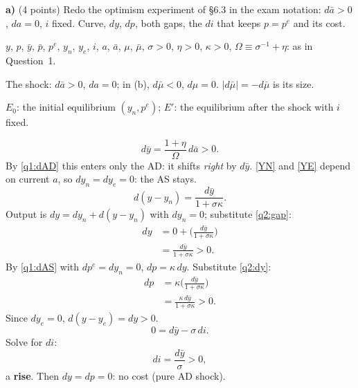 \textbf{a)} (4 points) Redo the optimism experiment of \S6.3 in the exam notation: $d\bar a>0$, $da=0$, $i$ fixed. Curve, $dy$, $dp$, both
gaps, the $di$ that keeps $p=p^e$ and its cost.
\resolespaco
\begin{sol}
\begin{notacao}
\item $y$, $p$, $\bar y$, $\bar p$, $p^e$, $y_n$, $y_e$, $i$, $a$, $\bar a$, $\mu$, $\bar\mu$, $\sigma>0$, $\eta>0$, $\kappa>0$, $\Omega\equiv\sigma^{-1}+\eta$: as in Question~1.
\item The shock: $d\bar a>0$, $da=0$; in (b), $d\bar\mu<0$, $d\mu=0$. $|d\bar\mu|=-d\bar\mu$ is its size.
\item $E_0$: the initial equilibrium $(y_n,p^e)$; $E'$: the equilibrium after the shock with $i$ fixed.
\end{notacao}
\begin{equation}
d\bar y=\frac{1+\eta}{\Omega}\,d\bar a>0 . \label{q2:dyb}
\end{equation}
By \eqref{q1:dAD} this enters only the AD: it shifts \emph{right} by $d\bar y$. \eqref{YN} and \eqref{YE} depend on current $a$, so
$dy_n=dy_e=0$: the AS stays.
\begin{equation}
d(y-y_n)=\frac{d\bar y}{1+\sigma\kappa}. \label{q2:gap}
\end{equation}
Output is $dy=dy_n+d(y-y_n)$ with $dy_n=0$; substitute \eqref{q2:gap}:
\begin{align}
dy&=0+\Big(\frac{d\bar y}{1+\sigma\kappa}\Big)\nonumber\\
&=\frac{d\bar y}{1+\sigma\kappa}>0 . \label{q2:dy}
\end{align}
By \eqref{q1:dAS} with $dp^e=dy_n=0$, $dp=\kappa\,dy$. Substitute \eqref{q2:dy}:
\begin{align}
dp&=\kappa\Big(\frac{d\bar y}{1+\sigma\kappa}\Big)\nonumber\\
&=\frac{\kappa\,d\bar y}{1+\sigma\kappa}>0 . \label{q2:dp}
\end{align}
Since $dy_e=0$, $d(y-y_e)=dy>0$.
\begin{equation}
0=d\bar y-\sigma\,di . \nonumber
\end{equation}
Solve for $di$:
\begin{equation}
di=\frac{d\bar y}{\sigma}>0 , \label{q2:di}
\end{equation}
a \textbf{rise}. Then $dy=dp=0$: no cost (pure AD shock).
\end{sol}

